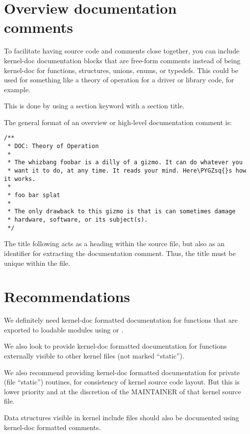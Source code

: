 \documentclass[a4paper,8pt,english]{sphinxmanual}
\def\PYGZsq{\char`\'}
\renewcommand\PYGZsq{\textquotesingle}
\begin{document}
\section{Overview documentation comments}
\label{doc-guide/kernel-doc:overview-documentation-comments}
To facilitate having source code and comments close together, you can include
kernel-doc documentation blocks that are free-form comments instead of being
kernel-doc for functions, structures, unions, enums, or typedefs. This could be
used for something like a theory of operation for a driver or library code, for
example.

This is done by using a  section keyword with a section title.

The general format of an overview or high-level documentation comment is:

\begin{Verbatim}[commandchars=\\\{\}]
/**
 * DOC: Theory of Operation
 *
 * The whizbang foobar is a dilly of a gizmo. It can do whatever you
 * want it to do, at any time. It reads your mind. Here\PYGZsq{}s how it works.
 *
 * foo bar splat
 *
 * The only drawback to this gizmo is that is can sometimes damage
 * hardware, software, or its subject(s).
 */
\end{Verbatim}

The title following  acts as a heading within the source file, but also
as an identifier for extracting the documentation comment. Thus, the title must
be unique within the file.


\section{Recommendations}
\label{doc-guide/kernel-doc:recommendations}
We definitely need kernel-doc formatted documentation for functions that are
exported to loadable modules using  or .

We also look to provide kernel-doc formatted documentation for functions
externally visible to other kernel files (not marked ``static'').

We also recommend providing kernel-doc formatted documentation for private (file
``static'') routines, for consistency of kernel source code layout. But this is
lower priority and at the discretion of the MAINTAINER of that kernel source
file.

Data structures visible in kernel include files should also be documented using
kernel-doc formatted comments.
\end{document}
